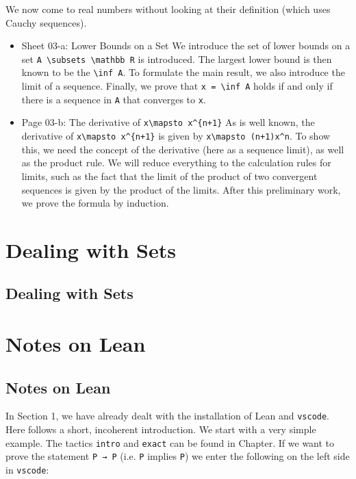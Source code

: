 \documentclass{memoir}
\begin{document}
We now come to real numbers without looking at their definition (which
uses Cauchy sequences).

\begin{itemize}
\item Sheet 03-a: Lower Bounds on a Set
   We introduce the set of lower bounds on a set \Verb|A \subsets \mathbb R| is introduced. The largest lower bound is then known to be the \Verb|\inf A|. To formulate the main result, we also introduce the limit of a sequence. Finally, we prove that \Verb|x = \inf A| holds if and only if there is a sequence in \Verb|A| that converges to \Verb|x|.\item Page 03-b: The derivative of \Verb|x\mapsto x^{n+1}|
    As is well known, the derivative of \Verb|x\mapsto x^{n+1}| is given by     \Verb|x\mapsto (n+1)x^n|. To show this, we need the concept of the derivative (here as a sequence limit), as well as the product rule. We will reduce everything to the calculation rules for limits, such as the fact that the limit of the product of two convergent sequences is given by the product of the limits. After this preliminary work, we prove the formula by induction.

\end{itemize}





\chapter{Dealing with Sets}



\section{Dealing with Sets}




\chapter{Notes on Lean}



\section{Notes on Lean}

In Section 1, we have already dealt with the installation of Lean and \Verb|vscode|. Here follows a short, incoherent introduction. We start with a very simple example. The tactics \Verb|intro| and \Verb|exact| can be found in
Chapter. If we want to prove the statement \Verb|P → P| (i.e. \Verb|P| implies \Verb|P|) we enter the following on the left side in \Verb|vscode|:
\end{document}
